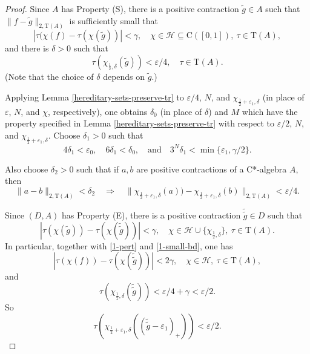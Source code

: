 \documentclass[12pt, oneside, psamsfonts]{amsart}
\theoremstyle{definition}
\theoremstyle{remark}
\numberwithin{equation}{section}
\newcommand{\norm}[1]{\| #1\|}
\newcommand{\abs}[1]{| #1 |}
\newcommand{\eps}{\varepsilon}
\newcommand{\tr}{\mathrm{T}}
\begin{document}
\begin{proof}
Since $A$ has Property (S), there is a positive contraction $\tilde{g} \in A$ such that $\norm{f - \tilde{g}}_{2, \tr(A)}$ is sufficiently small
that
\begin{equation}\label{1-pert}
\abs{ \tau(\chi(f) - \tau(\chi(\tilde{g}))} < \gamma, \quad \chi \in \mathcal H \subseteq \mathrm{C}([0, 1]),\ \tau \in \tr(A),
\end{equation}
and there is $\delta>0$ such that
\begin{equation}\label{1-small-bd}
\tau(\chi_{\frac{1}{2}, \delta}(\tilde{g})) < \eps/4,\quad \tau \in \tr(A).
\end{equation}
(Note that the choice of $\delta$ depends on $\tilde{g}$.) 



Applying Lemma \ref{hereditary-sets-preserve-tr} to $\eps/4$, $N$, and $\chi_{\frac{1}{2}+\eps_1, \delta}$ (in place of $\eps$, $N$, and $\chi$, respectively), one obtains $\delta_0$ (in place of $\delta$) and $M$ which have the property specified in Lemma \ref{hereditary-sets-preserve-tr} with respect to $\eps/2$, $N$, and $\chi_{\frac{1}{2}+\eps_1, \delta}$. Choose $\delta_1>0$ such that
$$4\delta_1 < \eps_0,\quad 6\delta_1 < \delta_0, \quad \mathrm{and} \quad 3^N\delta_1 < \min\{\eps_1, \gamma/2\} . $$

Also choose $\delta_2>0$ such that if $a, b$ are positive contractions of a C*-algebra $A$, then
\begin{equation}\label{choice-delta-2}
 \norm{a - b}_{2, \tr(A)} < \delta_2 \quad \Longrightarrow \quad \norm{\chi_{\frac{1}{2} + \eps_1, \delta}(a)) - \chi_{\frac{1}{2} + \eps_1, \delta}(b)}_{2, \tr(A)} < \eps/4.
\end{equation} 



Since $(D, A)$ has Property (E), there is a positive contraction $\tilde{\tilde{g}} \in D $ such that
\begin{equation}\label{2-pert}
\abs{\tau(\chi(\tilde{g})) - \tau(\chi(\tilde{\tilde{g}}))} < \gamma, \quad  \chi \in \mathcal H \cup \{ \chi_{\frac{1}{2}, \delta}\},\ \tau \in \tr(A).
\end{equation}
In particular, together with \eqref{1-pert} and \eqref{1-small-bd}, one has 
\begin{equation}\label{2-small-bd}
\abs{ \tau(\chi(f)) - \tau(\chi(\tilde{\tilde{g}})) } < 2 \gamma,\quad \chi \in \mathcal H,\ \tau \in \tr(A),
\end{equation}
and
\begin{equation}
\tau(\chi_{\frac{1}{2}, \delta}(\tilde{\tilde{g}})) < \eps/4+ \gamma < \eps/2.
\end{equation}
So
\begin{equation}\label{small-strech}
 \tau(\chi_{\frac{1}{2}+\eps_1, \delta}((\tilde{\tilde{g}} - \eps_1)_+))  < \eps/2. 
 \end{equation}


\end{proof}
\end{document}
